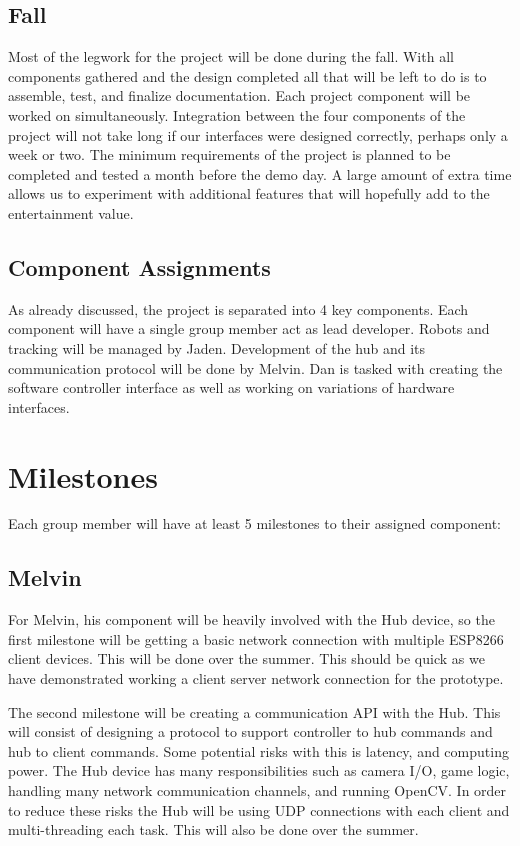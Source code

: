 \documentclass[11pt]{ieeeconf}
\begin{document}
\subsection{Fall}
Most of the legwork for the project will be done during the fall. With all components gathered and the design completed all that will be left to do is to assemble, test, and finalize documentation. Each project component will be worked on simultaneously. Integration between the four components of the project will not take long if our interfaces were designed correctly, perhaps only a week or two. The minimum requirements of the project is planned to be completed and tested a month before the demo day. A large amount of extra time allows us to experiment with additional features that will hopefully add to the entertainment value.

\subsection{Component Assignments}
As already discussed, the project is separated into 4 key components. Each component will have a single group member act as lead developer. Robots and tracking will be managed by Jaden. Development of the hub and its communication protocol will be done by Melvin. Dan is tasked with creating the software controller interface as well as working on variations of hardware interfaces. 


\section{Milestones}
Each group member will have at least 5 milestones to their assigned component: 

\subsection{Melvin}
For Melvin, his component will be heavily involved with the Hub device, so the first milestone will be getting a basic network connection with multiple ESP8266 client devices. This will be done over the summer. This should be quick as we have demonstrated working a client server network connection for the prototype. 

The second milestone will be creating a communication API with the Hub. This will consist of designing a protocol to support controller to hub commands and hub to client commands. Some potential risks with this is latency, and computing power. The Hub device has many responsibilities such as camera I/O, game logic, handling many network communication channels, and running OpenCV. In order to reduce these risks the Hub will be using UDP connections with each client and multi-threading each task. This will also be done over the summer.
\end{document}
